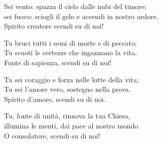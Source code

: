 

\spazio

\strofa Sei vento: spazza il cielo dalle nubi del timore;\\
sei fuoco: sciogli il gelo e accendi in nostro ardore.\\
Spirito creatore scendi su di noi!

\spazio


\spazio

\strofa Tu bruci tutti i semi di morte e di peccato;\\
Tu scuoti le certezze che ingannano la vita.\\
Fonte di sapienza, scendi su di noi!

\spazio


\spazio

\strofa Tu sei coraggio e forza nelle lotte della vita;\\
Tu sei l'amore vero, sostegno nella prova.\\
Spirito d'amore, scendi su di noi.

\spazio


\spazio

\strofa Tu, fonte di unità, rinnova la tua Chiesa,\\
illumina le menti, dai pace al nostro mondo.\\
O consolatore, scendi su di noi!
 
\spazio

